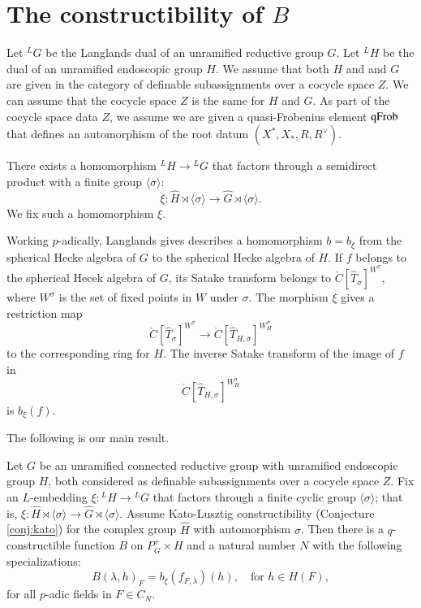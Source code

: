 

\section{The constructibility of $B$}

Let ${}^LG$ be the Langlands dual of an unramified reductive group $G$.  Let ${}^LH$ be the dual of an
unramified endoscopic group $H$.  We assume that both $H$ and and $G$ are given in the category of definable subassignments
over a cocycle space $Z$.  We can assume that the cocycle space $Z$ is the same for $H$ and $G$.
As part of the cocycle space data $Z$, we assume we are given a quasi-Frobenius element ${\operatorname{qFrob}}$ that defines an
automorphism of the root datum $(X^*,X_*,R,R^\vee)$.

There exists a homomorphism ${}^LH\to {}^LG$ that factors through a semidirect product with a finite group $\langle\sigma\rangle$:
\[
\xi:\hat H \rtimes \langle \sigma\rangle \to \hat G \rtimes \langle \sigma\rangle.
\]
We fix such a homomorphism $\xi$.  

Working $p$-adically, Langlands gives describes a homomorphism $b = b_\xi$
from the spherical Hecke algebra of $G$ to the spherical Hecke algebra of $H$.
If $f$ belongs to the spherical Hecek algebra of $G$, its Satake transform belongs
to $\ring{C}[\hat T_\sigma]^{W^\sigma}$, where $W^\sigma$ is the set of fixed points in $W$ under $\sigma$.
The morphism $\xi$ gives a restriction map
\[
\ring{C}[\hat T_\sigma]^{W^\sigma} \to \ring{C}[\hat T_{H,\sigma}]^{W_H^\sigma}
\]
to the corresponding ring for $H$.  The inverse Satake transform of the image of $f$ in
\[
\ring{C}[\hat T_{H,\sigma}]^{W_H^\sigma}
\]
is $b_\xi(f)$.

The following is our main result.

\begin{theorem}
Let $G$ be an unramified connected reductive group with unramified endoscopic group $H$, both considered as definable
subassignments over a cocycle space $Z$.  Fix an $L$-embedding $\xi:{}^LH\to {}^LG$ that factors through a finite
cyclic group $\langle \sigma\rangle$; that is, $\xi:\hat H\rtimes \langle \sigma\rangle \to \hat G \rtimes \langle \sigma\rangle$.
Assume Kato-Lusztig constructibility (Conjecture \ref{conj:kato}) for the complex group $\hat H$ with automorphism $\sigma$.
Then
there is a $q$-constructible function $B$ on $P^+_G\times H$ and a natural number $N$ with the following specializations:
\[
B(\lambda,h)_F = b_\xi(f_{F,\lambda})(h),\quad \text{for } h\in H(F),
\]
for all $p$-adic fields in $F\in C_N$.  
\end{theorem}


